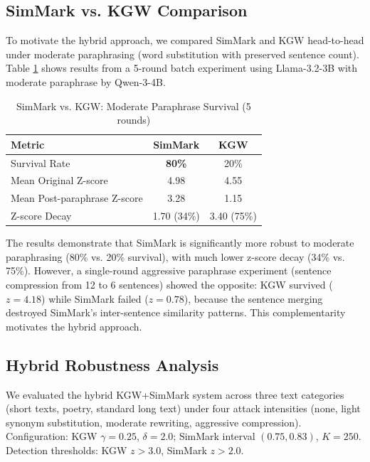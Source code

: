 \documentclass[12pt,letterpaper]{article}
\begin{document}
\subsection{SimMark vs. KGW Comparison}

To motivate the hybrid approach, we compared SimMark and KGW head-to-head under moderate paraphrasing (word substitution with preserved sentence count). Table \ref{tab:simmark_vs_kgw_batch} shows results from a 5-round batch experiment using Llama-3.2-3B with moderate paraphrase by Qwen-3-4B.

\begin{table}[H]
\centering
\caption{SimMark vs. KGW: Moderate Paraphrase Survival (5 rounds)}
\label{tab:simmark_vs_kgw_batch}
\begin{tabular}{lcc}
\toprule
\textbf{Metric} & \textbf{SimMark} & \textbf{KGW} \\
\midrule
Survival Rate & \textbf{80\%} & 20\% \\
Mean Original Z-score & 4.98 & 4.55 \\
Mean Post-paraphrase Z-score & 3.28 & 1.15 \\
Z-score Decay & 1.70 (34\%) & 3.40 (75\%) \\
\bottomrule
\end{tabular}
\end{table}

The results demonstrate that SimMark is significantly more robust to moderate paraphrasing (80\% vs. 20\% survival), with much lower z-score decay (34\% vs. 75\%). However, a single-round aggressive paraphrase experiment (sentence compression from 12 to 6 sentences) showed the opposite: KGW survived ($z = 4.18$) while SimMark failed ($z = 0.78$), because the sentence merging destroyed SimMark's inter-sentence similarity patterns. This complementarity motivates the hybrid approach.

\subsection{Hybrid Robustness Analysis}

We evaluated the hybrid KGW+SimMark system across three text categories (short texts, poetry, standard long text) under four attack intensities (none, light synonym substitution, moderate rewriting, aggressive compression). Configuration: KGW $\gamma=0.25$, $\delta=2.0$; SimMark interval $(0.75, 0.83)$, $K=250$. Detection thresholds: KGW $z > 3.0$, SimMark $z > 2.0$.
\end{document}
